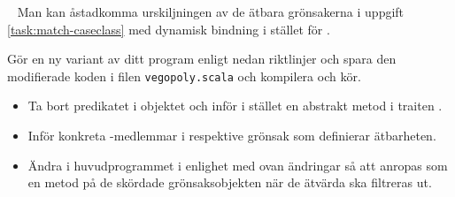 










\AdvancedTasks %




\QUESTBEGIN

\Task  \what~ Man kan åstadkomma urskiljningen av de ätbara grönsakerna i uppgift \ref{task:match-caseclass} med dynamisk bindning i stället för .

\Subtask Gör en ny variant av ditt program enligt nedan riktlinjer och spara den modifierade koden i filen \texttt{vegopoly.scala} och kompilera och kör.
\begin{itemize}[noitemsep]
\item Ta bort predikatet \ifswedish{}\else{}\fi{} i objektet  och inför i stället en abstrakt metod \ifswedish{}\else{}\fi{} i traiten \ifswedish{}\else{}\fi.
\item Inför konkreta -medlemmar i respektive grönsak som definierar ätbarheten.
\item Ändra i huvudprogrammet i enlighet med ovan ändringar så att \ifswedish{}\else{}\fi{} anropas som en metod på de skördade grönsaksobjekten när de ätvärda ska filtreras ut.
\end{itemize}

